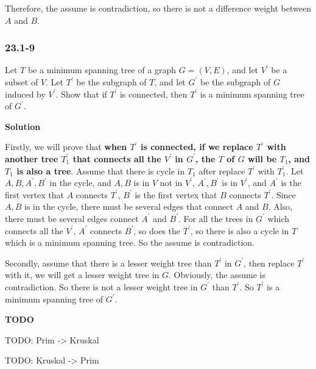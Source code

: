 Therefore, the assume is contradiction, so there is not a difference weight
between $A$ and $B$.

\subsubsection{23.1-9}

Let $T$ be a minimum spanning tree of a  graph $G = (V, E)$, and let $V^{'}$ be
a subset of $V$. Let $T^{'}$ be the subgraph of $T$, and let $G^{'}$ be the
subgraph of $G$ induced by $V^{'}$. Show that if $T^{'}$ is connected, then
$T^{'}$ is a minimum spanning tree of $G^{'}$.

\textbf{Solution}

Firstly, we will prove that \textbf{when $T^{'}$ is connected, if we replace
$T^{'}$ with another tree $T^{'}_1$ that connects all the $V^{'}$ in $G^{'}$,
the $T$ of $G$ will be $T_1$, and $T_1$ is also a tree}. Assume that there is
cycle in $T_1$ after replace $T^{'}$ with $T^{'}_1$. Let $A, B, A^{'}, B^{'}$
in the cycle, and $A, B$ is in $V$ not in $V^{'}$, $A^{'}, B^{'}$ is in $V^{'}$,
and $A^{'}$ is the first vertex that $A$ connects $T^{'}$, $B^{'}$ is the first
vertex that $B$ connects $T^{'}$. Since $A, B$ is in the cycle, there must be
several edges that connect $A$ and $B$. Also, there must be several edges
connect $A^{'}$ and $B^{'}$. For all the trees in $G^{'}$ which connects all the
$V^{'}$, $A^{'}$ connects $B^{'}$, so does the $T^{'}$, so there is also a
cycle in $T$ which is a minimum spanning tree. So the assume is contradiction. 

Secondly, assume that there is a lesser weight tree than $T^{'}$ in $G^{'}$,
then replace $T^{'}$ with it, we will get a lesser weight tree in $G$.
Obviously, the assume is contradiction. So there is not a lesser weight tree in
$G^{'}$ than $T^{'}$. So $T^{'}$ is a minimum spanning tree of $G^{'}$.




\textbf{TODO}

TODO: Prim -> Kruskal

TODO: Kruskal -> Prim
